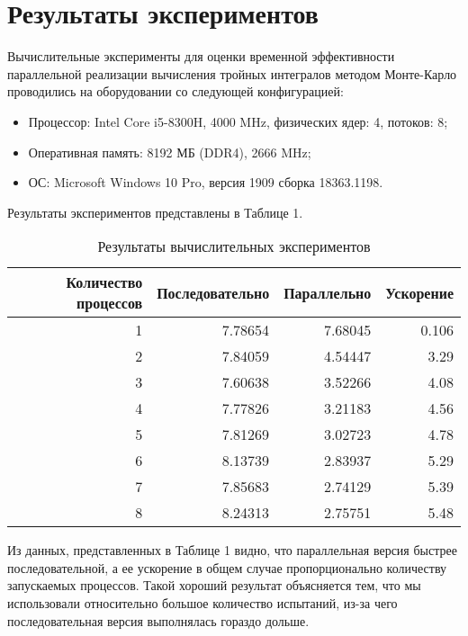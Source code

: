 \documentclass{report}
\begin{document}
\section*{Результаты экспериментов}
Вычислительные эксперименты для оценки временной эффективности параллельной реализации вычисления тройных интегралов методом Монте-Карло проводились на оборудовании со следующей конфигурацией:
\begin{itemize}
\item Процессор: Intel Core i5-8300H, 4000 MHz, физических ядер: 4, потоков: 8;
\item Оперативная память: 8192 МБ (DDR4), 2666 MHz;
\item ОС: Microsoft Windows 10 Pro, версия 1909 сборка 18363.1198.
\end{itemize}

\par Результаты экспериментов представлены в Таблице 1.

\begin{table}[!h]
\caption{Результаты вычислительных экспериментов}
\centering
\begin{tabular}{| r | r | r | r |}
\hline
Количество процессов & Последовательно & Параллельно & Ускорение  \\[5pt]
\hline
1        & 7.78654        & 7.68045     & 0.106       \\
2        & 7.84059        & 4.54447     & 3.29       \\
3        & 7.60638        & 3.52266     & 4.08       \\
4        & 7.77826        & 3.21183     & 4.56       \\
5        & 7.81269        & 3.02723     & 4.78       \\
6        & 8.13739        & 2.83937     & 5.29       \\
7        & 7.85683        & 2.74129     & 5.39	    \\
8        & 8.24313        & 2.75751     & 5.48	  \\
\hline
\end{tabular}
\end{table}

\par Из данных, представленных в Таблице 1 видно, что параллельная версия быстрее последовательной, а ее ускорение в общем случае пропорционально количеству запускаемых процессов. Такой хороший результат объясняется тем, что мы использовали относительно большое количество испытаний, из-за чего последовательная версия выполнялась гораздо дольше.
\newpage
\end{document}
